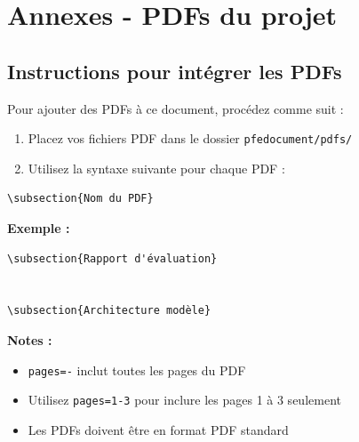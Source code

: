 \documentclass[12pt,a4paper]{article}
\begin{document}
\newpage

\newpage
\appendix

\section{Annexes - PDFs du projet}

\subsection{Instructions pour intégrer les PDFs}

Pour ajouter des PDFs à ce document, procédez comme suit :

\begin{enumerate}
    \item Placez vos fichiers PDF dans le dossier \texttt{pfedocument/pdfs/}
    \item Utilisez la syntaxe suivante pour chaque PDF :
\end{enumerate}

\begin{verbatim}
\subsection{Nom du PDF}

\end{verbatim}

\textbf{Exemple :}
\begin{verbatim}
\subsection{Rapport d'évaluation}


\subsection{Architecture modèle}

\end{verbatim}

\vspace{1cm}

\textbf{Notes :}
\begin{itemize}
    \item \texttt{pages=-} inclut toutes les pages du PDF
    \item Utilisez \texttt{pages=1-3} pour inclure les pages 1 à 3 seulement
    \item Les PDFs doivent être en format PDF standard
\end{itemize}
\end{document}
